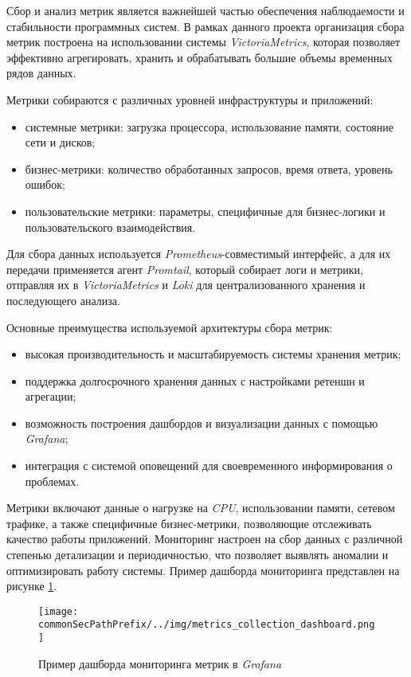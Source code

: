 Сбор и анализ метрик является важнейшей частью обеспечения наблюдаемости и стабильности программных систем. В рамках данного проекта организация сбора метрик построена на использовании системы \textit{VictoriaMetrics}, которая позволяет эффективно агрегировать, хранить и обрабатывать большие объемы временных рядов данных.

Метрики собираются с различных уровней инфраструктуры и приложений:

\begin{itemize}
    \item системные метрики: загрузка процессора, использование памяти, состояние сети и дисков;
    \item бизнес-метрики: количество обработанных запросов, время ответа, уровень ошибок;
    \item пользовательские метрики: параметры, специфичные для бизнес-логики и пользовательского взаимодействия.
\end{itemize}

Для сбора данных используется \textit{Prometheus}-совместимый интерфейс, а для их передачи применяется агент \textit{Promtail}, который собирает логи и метрики, отправляя их в \textit{VictoriaMetrics} и \textit{Loki} для централизованного хранения и последующего анализа.

Основные преимущества используемой архитектуры сбора метрик:

\begin{itemize}
    \item высокая производительность и масштабируемость системы хранения метрик;
    \item поддержка долгосрочного хранения данных с настройками ретеншн и агрегации;
    \item возможность построения дашбордов и визуализации данных с помощью \textit{Grafana};
    \item интеграция с системой оповещений для своевременного информирования о проблемах.
\end{itemize}

Метрики включают данные о нагрузке на \textit{CPU}, использовании памяти, сетевом трафике, а также специфичные бизнес-метрики, позволяющие отслеживать качество работы приложений. Мониторинг настроен на сбор данных с различной степенью детализации и периодичностью, что позволяет выявлять аномалии и оптимизировать работу системы. Пример дашборда мониторинга представлен на рисунке \ref{fig:metrics_collection_dashboard}.
\begin{figure}[ht]
    \centering
    \texttt{[image: \\commonSecPathPrefix/../img/metrics\_collection\_dashboard.png]}
    \caption{Пример дашборда мониторинга метрик в \textit{Grafana}}
    \label{fig:metrics_collection_dashboard}
\end{figure}

